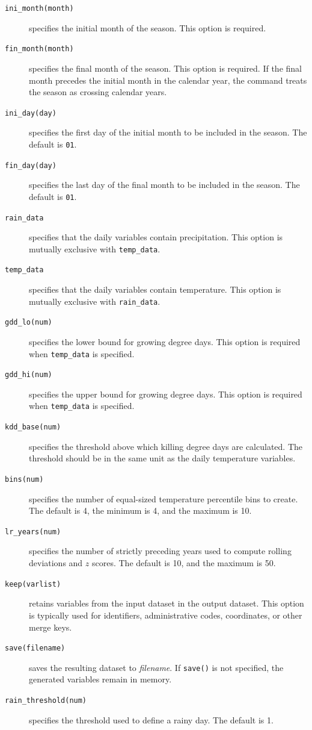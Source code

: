 \begin{description}
\item[\texttt{ini\_month(month)}] specifies the initial month of the season. This option is required.

\item[\texttt{fin\_month(month)}] specifies the final month of the season. This option is required. If the final month precedes the initial month in the calendar year, the command treats the season as crossing calendar years.

\item[\texttt{ini\_day(day)}] specifies the first day of the initial month to be included in the season. The default is \texttt{01}.

\item[\texttt{fin\_day(day)}] specifies the last day of the final month to be included in the season. The default is \texttt{01}.

\item[\texttt{rain\_data}] specifies that the daily variables contain precipitation. This option is mutually exclusive with \texttt{temp\_data}.

\item[\texttt{temp\_data}] specifies that the daily variables contain temperature. This option is mutually exclusive with \texttt{rain\_data}.

\item[\texttt{gdd\_lo(num)}] specifies the lower bound for growing degree days. This option is required when \texttt{temp\_data} is specified.

\item[\texttt{gdd\_hi(num)}] specifies the upper bound for growing degree days. This option is required when \texttt{temp\_data} is specified.

\item[\texttt{kdd\_base(num)}] specifies the threshold above which killing degree days are calculated. The threshold should be in the same unit as the daily temperature variables.

\item[\texttt{bins(num)}] specifies the number of equal-sized temperature percentile bins to create. The default is 4, the minimum is 4, and the maximum is 10.

\item[\texttt{lr\_years(num)}] specifies the number of strictly preceding years used to compute rolling deviations and $z$ scores. The default is 10, and the maximum is 50.

\item[\texttt{keep(varlist)}] retains variables from the input dataset in the output dataset. This option is typically used for identifiers, administrative codes, coordinates, or other merge keys.

\item[\texttt{save(filename)}] saves the resulting dataset to \textit{filename}. If \texttt{save()} is not specified, the generated variables remain in memory.

\item[\texttt{rain\_threshold(num)}] specifies the threshold used to define a rainy day. The default is 1.
\end{description}

